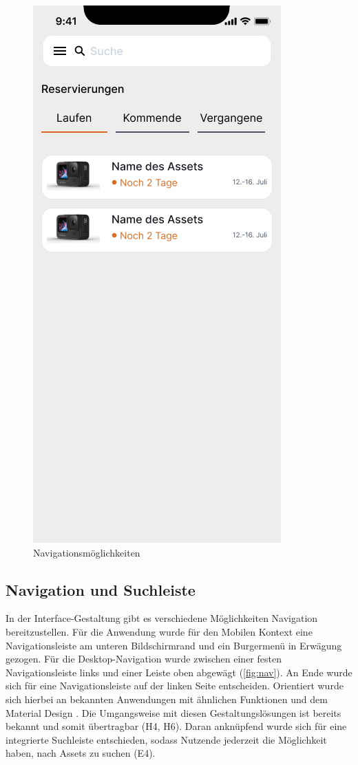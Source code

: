 \begin{figure}[h]
    \includegraphics[scale=0.4]{Bilder/Prototyp/Neu/V2.png}
    \caption[-]{Navigationsmöglichkeiten}
    \label{fig:home}
\end{figure}

\subsection{Navigation und Suchleiste}
In der Interface-Gestaltung gibt es verschiedene Möglichkeiten Navigation bereitzustellen. Für die
Anwendung wurde für den Mobilen Kontext eine Navigationsleiste am unteren Bildschirmrand und ein
Burgermenü in Erwägung gezogen. Für die Desktop-Navigation wurde zwischen einer festen
Navigationsleiste links und einer Leiste oben abgewägt (\ref{fig:nav}). An Ende wurde sich für eine
Navigationsleiste auf der linken Seite entscheiden. Orientiert wurde sich hierbei an bekannten
Anwendungen mit ähnlichen Funktionen und dem Material Design \cite{google_material_2022}. Die
Umgangsweise mit diesen Gestaltungslösungen ist bereits bekannt und somit übertragbar (H4, H6).
Daran anknüpfend wurde sich für eine integrierte Suchleiste entschieden, sodass Nutzende jederzeit
die Möglichkeit haben, nach Assets zu suchen \cite{google_material_2022} (E4).


